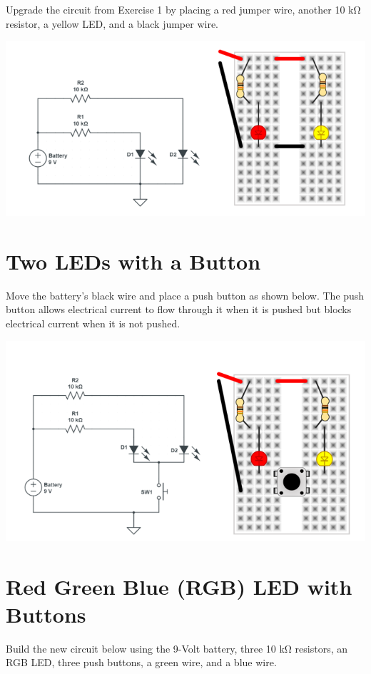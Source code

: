 \documentclass[
]{book}
\begin{document}
Upgrade the circuit from Exercise 1 by placing a red jumper wire, another 10 kΩ resistor, a yellow LED, and a black jumper wire.

\includegraphics{images/two_led_diagram.png}

\hypertarget{two-leds-with-a-button}{%
\chapter{Two LEDs with a Button}\label{two-leds-with-a-button}}

Move the battery's black wire and place a push button as shown below. The push button allows electrical current to flow through it when it is pushed but blocks electrical current when it is not pushed.

\includegraphics{images/two_led_with_button_diagram.png}

\hypertarget{red-green-blue-rgb-led-with-buttons}{%
\chapter{Red Green Blue (RGB) LED with Buttons}\label{red-green-blue-rgb-led-with-buttons}}

Build the new circuit below using the 9-Volt battery, three 10 kΩ resistors, an RGB LED, three push buttons, a green wire, and a blue wire.
\end{document}
